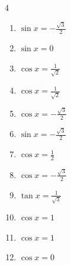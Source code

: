 \begin{multicols}{4}
\begin{enumerate}
  \item $\displaystyle \sin{x}  = -\frac{\sqrt{3}}{2}$


  \item $\displaystyle \sin{x}  = 0$

        \phantom{$\displaystyle x = 0 , \pi$}

  \item $\displaystyle \cos{x}  = \frac{1}{\sqrt{2}}$


  \item $\displaystyle \cos{x}  = \frac{1}{\sqrt{2}}$


  \item $\displaystyle \cos{x}  = -\frac{\sqrt{3}}{2}$


  \item $\displaystyle \sin{x}  = -\frac{\sqrt{3}}{2}$


  \item $\displaystyle \cos{x}  = \frac{1}{2}$


  \item $\displaystyle \cos{x}  = -\frac{\sqrt{3}}{2}$


  \item $\displaystyle \tan{x}  = \frac{1}{\sqrt{3}}$


  \item $\displaystyle \cos{x}  = 1$

        \phantom{$\displaystyle x = 0$}

  \item $\displaystyle \cos{x}  = 1$

        \phantom{$\displaystyle x = 0$}

  \item $\displaystyle \cos{x}  = 0$


\end{enumerate}
\end{multicols}
